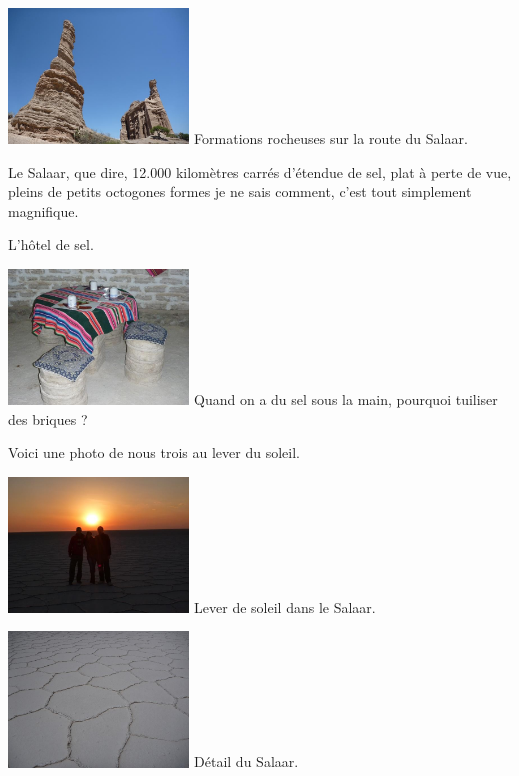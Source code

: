 \begin{multicols}{2}
\hspace*{-0.65cm}
\includegraphics[width=4.8cm]{articles/La-paz-humahuaca-et-salaar/1257387285NQRd.jpg}
Formations rocheuses sur la route du Salaar.

Le Salaar, que dire, 12.000 kilomètres carrés d'étendue de sel, plat à perte de vue, pleins de petits octogones formes je ne sais comment, c'est tout simplement magnifique.

L'hôtel de sel.

\hspace*{-0.65cm}
\includegraphics[width=4.8cm]{articles/La-paz-humahuaca-et-salaar/12573872732dVv.jpg}
Quand on a du sel sous la main, pourquoi tuiliser des briques ?

Voici une photo de nous trois au lever du soleil.

\hspace*{-0.65cm}
\includegraphics[width=4.8cm]{articles/La-paz-humahuaca-et-salaar/1257203731jBS0.jpg}
Lever de soleil dans le Salaar.

\hspace*{-0.65cm}
\includegraphics[width=4.8cm]{articles/La-paz-humahuaca-et-salaar/1257389754e5dq.jpg}
Détail du Salaar.


\end{multicols}
